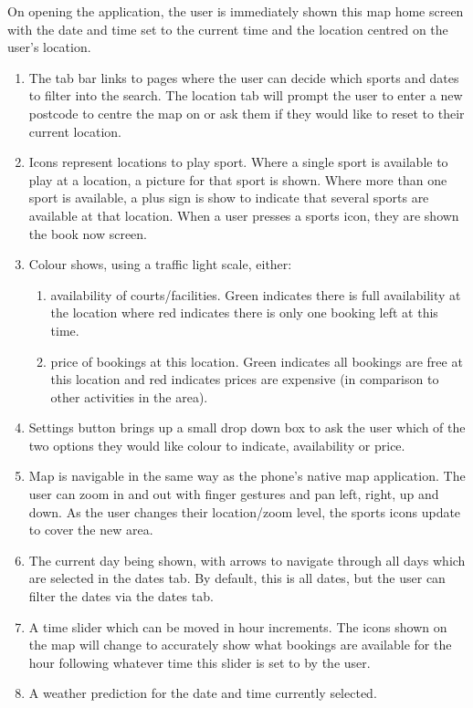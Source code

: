 On opening the application, the user is immediately shown this map home screen
with the date and time set to the current time and the location centred on the
user's location.
\begin{enumerate}
	\item\label{hometabs} The tab bar links to pages where the user can decide
		which sports and dates to filter into the search. The location tab will
		prompt the user to enter a new postcode to centre the map on or ask
		them if they would like to reset to their current location.
	\item Icons represent locations to play sport. Where a single sport is
		available to play at a location, a picture for that sport is shown.
		Where more than one sport is available, a plus sign is show to indicate
		that several sports are available at that location. When a user presses
		a sports icon, they are shown the book now screen.
	\item Colour shows, using a traffic light scale, either:
		\begin{enumerate}
			\item availability of courts/facilities. Green indicates there is
				full availability at the location where red indicates there is
				only one booking left at this time.
			\item price of bookings at this location. Green indicates all
				bookings are free at this location and red indicates prices are
				expensive (in comparison to other activities in the area).
		\end{enumerate}

	\item Settings button brings up a small drop down box to ask the user which
		of the two options they would like colour to indicate, availability or
		price.
	\item Map is navigable in the same way as the phone's native map
		application.  The user can zoom in and out with finger gestures and pan
		left, right, up and down. As the user changes their location/zoom
		level, the sports icons update to cover the new area.
	\item The current day being shown, with arrows to navigate through all days
		which are selected in the dates tab. By default, this is all dates, but
		the user can filter the dates via the dates tab.
	\item A time slider which can be moved in hour increments. The icons shown
		on the map will change to accurately show what bookings are available
		for the hour following whatever time this slider is set to by the user.
	\item A weather prediction for the date and time currently selected.
\end{enumerate}

